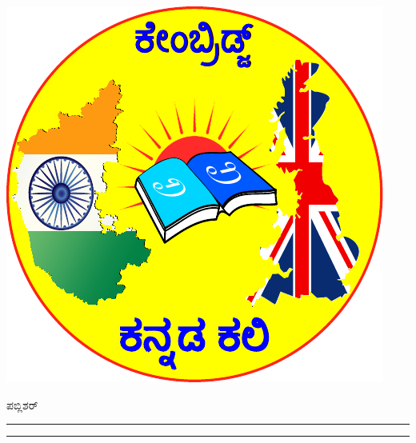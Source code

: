 \documentclass[16pt]{book}
\begin{document}
\begin{titlepage}
	\includegraphics[scale=0.4]{KKali_logo.pdf}
	\vfill
	
	
	{\large\textsc{ಪಬ್ಲಿಶರ್}} %
	
	\vspace{0.1\textheight} %
	
	
	\rule{\textwidth}{0.4pt} %
\begin{small}
\color{gray}{(ಸೂಚನೆ: ಈ ಟ್ಯುಟೋರಿಯಲ್‌ ಪುಸ್ತಕಕ್ಕೆ ಬಳಸಿದ್ದು ಸ್ಕ್ರಾಚ್ 1.4 ಆವೃತ್ತಿ)}\par
\end{small}

	\vspace{8pt}\vspace{-\baselineskip} %
	
	\rule{\textwidth}{1pt} %
	
\end{titlepage}
\end{document}
